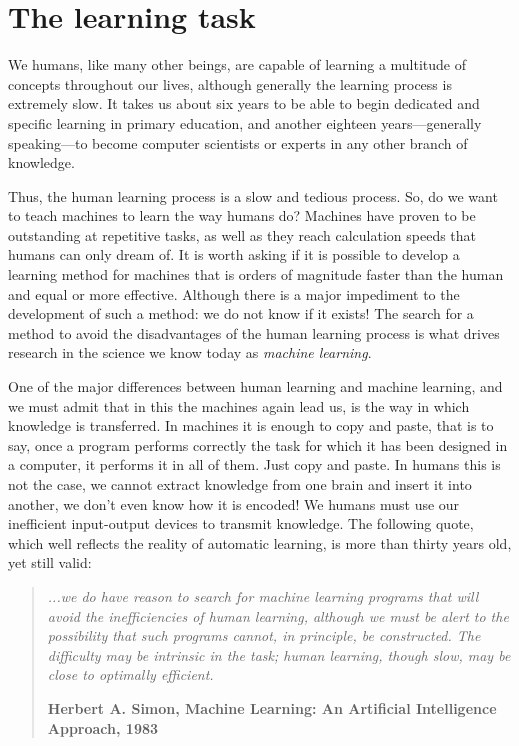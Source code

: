 \section{The learning task}

We humans, like many other beings, are capable of learning a multitude of concepts throughout our lives, although generally the learning process is extremely slow. It takes us about six years to be able to begin dedicated and specific learning in primary education, and another eighteen years---generally speaking---to become computer scientists or experts in any other branch of knowledge.

Thus, the human learning process is a slow and tedious process. So, do we want to teach machines to learn the way humans do? Machines have proven to be outstanding at repetitive tasks, as well as they reach calculation speeds that humans can only dream of. It is worth asking if it is possible to develop a learning method for machines that is orders of magnitude faster than the human and equal or more effective. Although there is a major impediment to the development of such a method: we do not know if it exists! The search for a method to avoid the disadvantages of the human learning process is what drives research in the science we know today as \textit{machine learning}. 

One of the major differences between human learning and machine learning, and we must admit that in this the machines again lead us, is the way in which knowledge is transferred. In machines it is enough to copy and paste, that is to say, once a program performs correctly the task for which it has been designed in a computer, it performs it in all of them. Just copy and paste. In humans this is not the case, we cannot extract knowledge from one brain and insert it into another, we don't even know how it is encoded! We humans must use our inefficient input-output devices to transmit knowledge. The following quote, which well reflects the reality of automatic learning, is more than thirty years old, yet still valid:

\begin{quotation}{\slshape
		...we do have reason to search for machine learning programs that will avoid the inefficiencies of human learning, although we must be alert to the possibility that such programs cannot, in principle, be constructed. The difficulty may be intrinsic in the task; human learning, though slow, may be close to optimally efficient.}
	\begin{flushright}
		\textbf{Herbert A. Simon, Machine Learning: An Artificial Intelligence Approach, 1983} 
	\end{flushright}
\end{quotation}

